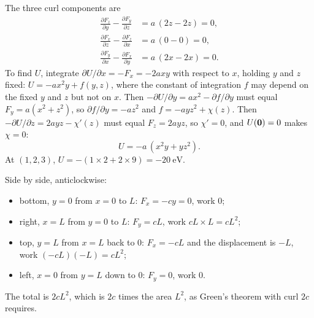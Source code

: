 The three curl components are
\begin{align*}
   \frac{\partial F_z}{\partial y} - \frac{\partial F_y}{\partial z}
   &= a\,(2z - 2z) = 0 ,\\
   \frac{\partial F_x}{\partial z} - \frac{\partial F_z}{\partial x}
   &= a\,(0 - 0) = 0 ,\\
   \frac{\partial F_y}{\partial x} - \frac{\partial F_x}{\partial y}
   &= a\,(2x - 2x) = 0 .
\end{align*}
To find $U$, integrate $\partial U/\partial x = -F_x = -2axy$ with
respect to $x$, holding $y$ and $z$ fixed: $U = -ax^2y + f(y, z)$, where
the constant of integration $f$ may depend on the fixed $y$ and $z$ but
not on $x$. Then $-\partial
U/\partial y = ax^2 - \partial f/\partial y$ must equal $F_y = a(x^2 +
z^2)$, so $\partial f/\partial y = -az^2$ and $f = -ayz^2 + \chi(z)$. Then
$-\partial U/\partial z = 2ayz - \chi'(z)$ must equal $F_z = 2ayz$, so $\chi' =
0$, and $U(\bm{\mathrm{0}}) = 0$ makes $\chi = 0$:
\begin{equation*}
   U = -a\,(x^2y + yz^2) .
\end{equation*}
At $(1, 2, 3)$, $U = -(1\times2 + 2\times9) = \SI{-20}{\electronvolt}$.

Side by side, anticlockwise:
\begin{itemize}
\item bottom, $y = 0$ from $x = 0$ to $L$: $F_x = -cy = 0$, work 0;
\item right, $x = L$ from $y = 0$ to $L$: $F_y = cL$, work $cL\times L =
   cL^2$;
\item top, $y = L$ from $x = L$ back to 0: $F_x = -cL$ and the
   displacement is $-L$, work $(-cL)(-L) = cL^2$;
\item left, $x = 0$ from $y = L$ down to 0: $F_y = 0$, work 0.
\end{itemize}
The total is $2cL^2$, which is $2c$ times the area $L^2$, as Green's
theorem with curl $2c$ requires.

